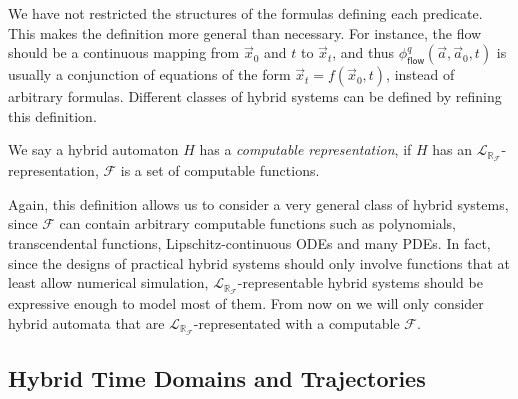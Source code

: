 \documentclass[envcountsect]{llncs}
\newcommand{\flow}{\mathsf{flow}}
\newcommand{\lrf}{\mathcal{L}_{\mathbb{R}_{\mathcal{F}}}}
\begin{document}
\begin{remark}
We have not restricted the structures of the formulas defining each
predicate. This makes the definition more general
than necessary. For instance, the flow should be a continuous mapping from $\vec
x_0$ and $t$ to $\vec x_t$, and thus $\phi^q_{\flow}(\vec a,
\vec a_0, t)$ is usually a conjunction of equations of the form $\vec x_t =
f(\vec x_0, t)$, instead of arbitrary formulas. Different classes of hybrid
systems can be defined by refining this definition.
\end{remark}

\begin{definition}
We say a hybrid automaton $H$ has a {\em computable representation}, if $H$ has
an $\lrf$-representation, $\mathcal{F}$ is a set of computable functions.
\end{definition}

Again, this definition allows us to consider a very general class of hybrid
systems, since $\mathcal{F}$ can contain arbitrary computable functions such as
polynomials, transcendental functions, Lipschitz-continuous ODEs and many PDEs.
In fact, since the designs of practical hybrid systems should only involve
functions that at least allow numerical simulation, $\lrf$-representable hybrid
systems should be expressive enough to model most of them. From now on we will
only consider hybrid automata that are $\lrf$-representated with a
computable $\mathcal{F}$.

\subsection{Hybrid Time Domains and Trajectories}
\end{document}
